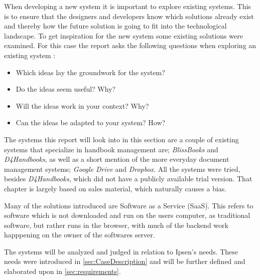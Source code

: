 When developing a new system it is important to explore existing systems.
This is to ensure that the designers and developers know which solutions already exist and thereby how the future solution is going to fit into the technological landscape.
To get inspiration for the new system some existing solutions were examined.
For this case the report asks the following questions when exploring an existing system \citep[p.~33]{Rod-Aalborg}:

\begin{itemize}
  \item Which ideas lay the groundwork for the system?
  \item Do the ideas seem useful? Why?
  \item Will the ideas work in your context? Why?
  \item Can the ideas be adapted to your system? How?
\end{itemize}

The systems this report will look into in this section are a couple of existing systems that specialize in handbook management are; \textit{BlissBooks} and \textit{D4Handbooks}, as well as a short mention of the more everyday document management systems; \textit{Google Drive} and \textit{Dropbox}. All the systems were tried, besides \textit{D4Handbooks}, which did not have a publicly available trial version. That chapter is largely based on sales material, which naturally causes a bias.

Many of the solutions introduced are Software as a Service (SaaS). This refers to software which is not downloaded and run on the users computer, as traditional software, but rather runs in the browser, with much of the backend work happpening on the owner of the softwares server.

The systems will be analyzed and judged in relation to Ipsen's needs.
These needs were introduced in \ref{sec:CaseDescription} and will be further defined and elaborated upon in \ref{sec:requirements}.
